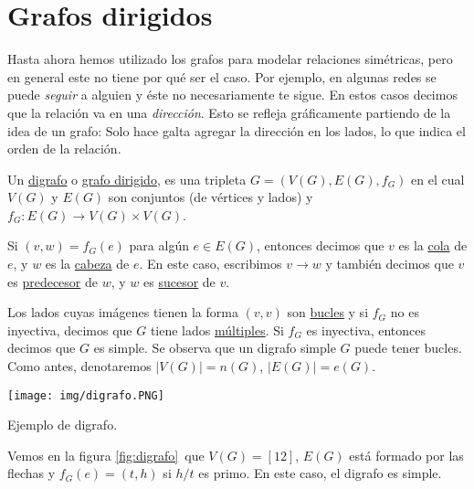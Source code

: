 \section{Grafos dirigidos}

Hasta ahora hemos utilizado los grafos para modelar relaciones simétricas, pero en general este no tiene por qué ser el caso. Por ejemplo, en algunas redes se puede \textit{seguir} a alguien y éste no necesariamente te sigue. En estos casos decimos que la relación va en una \textit{dirección}. Esto se refleja gráficamente partiendo de la idea de un grafo: Solo hace galta agregar la dirección en los lados, lo que indica el orden de la relación.

\begin{defn}
    Un \ul{digrafo} o \ul{grafo dirigido}, es una tripleta $G = ( V(G), E(G), f_G)$ en el cual $V(G)$ y $E(G)$ son conjuntos (de vértices y lados) y $f_G: E(G) \rightarrow V(G) \times V(G)$.
    
    Si $(v,w) = f_G(e)$ para algún $e \in E(G)$, entonces decimos que $v$ es la \ul{cola} de $e$, y $w$ es la \ul{cabeza} de $e$. En este caso, escribimos $v \rightarrow w$ y también decimos que $v$ es \ul{predecesor} de $w$, y $w$ es \ul{sucesor} de $v$.
    
    Los lados cuyas imágenes tienen la forma $(v,v)$ son \ul{bucles} y si $f_G$ no es inyectiva, decimos que $G$ tiene lados \ul{múltiples}. Si $f_G$ es inyectiva, entonces decimos que $G$ es simple. Se observa que un digrafo simple $G$ puede tener bucles. Como antes, denotaremos $|V(G)| = n(G)$, $|E(G)| = e(G)$.
\end{defn}

\begin{ejem}
    \begin{marginfigure}
        \centering
        \texttt{[image: img/digrafo.PNG]}
        \caption{Ejemplo de digrafo.}
        \label{fig:digrafo}
    \end{marginfigure}
    
    Vemos en la figura \ref{fig:digrafo}~que $V(G) = [12]$, $E(G)$ está formado por las flechas y $f_G(e) = (t,h)$ si $h/t$ es primo. En este caso, el digrafo es simple.
\end{ejem}

